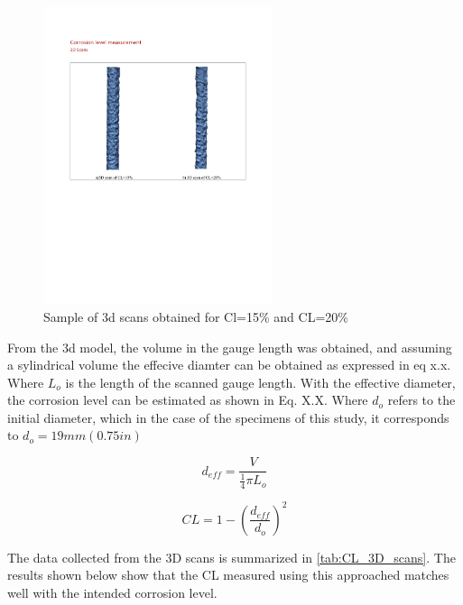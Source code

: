 \begin{figure}[htbp]
	\centering
	\includegraphics[width=0.6\textwidth]{VAC Thesis 2.0/Chapter-4/figs/3dScans_sample.pdf}
	\caption{Sample of 3d scans obtained for Cl=15\% and CL=20\%}
    \label{fig:3D_scans_sample}
\end{figure}

From the 3d model, the volume in the gauge length was obtained, and assuming a sylindrical volume the effecive diamter can be obtained as expressed in eq x.x. Where $L_{o}$ is the length of the scanned gauge length. With the effective diameter, the corrosion level can be estimated as shown in Eq. X.X. Where $d_{o}$ refers to the initial diameter, which in the case of the specimens of this study, it corresponds to $d_{o}=19mm (0.75 in)$

\begin{equation}
    d_{eff}=\frac{V}{\frac{1}{4}\pi L_{o}}
    \label{eq:eff_diameter}
\end{equation}

\begin{equation}
    CL=1-(\frac{d_{eff}}{d_{o}})^2
    \label{eq:CL_diameter}
\end{equation}

The data collected from the 3D scans is summarized in \ref{tab:CL_3D_scans}. The results shown below show that the CL measured using this approached matches well with the intended corrosion level.


